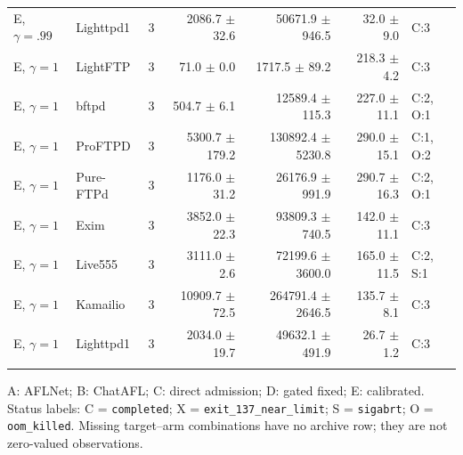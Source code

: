 \begin{longtable}{@{}llrrrrl@{}}
E, $\gamma=.99$ & Lighttpd1 & 3 & 2086.7 $\pm$ 32.6 & 50671.9 $\pm$ 946.5 & 32.0 $\pm$ 9.0 & C:3 \\
\addlinespace[3pt]
E, $\gamma=1$ & LightFTP & 3 & 71.0 $\pm$ 0.0 & 1717.5 $\pm$ 89.2 & 218.3 $\pm$ 4.2 & C:3 \\
E, $\gamma=1$ & bftpd & 3 & 504.7 $\pm$ 6.1 & 12589.4 $\pm$ 115.3 & 227.0 $\pm$ 11.1 & C:2, O:1 \\
E, $\gamma=1$ & ProFTPD & 3 & 5300.7 $\pm$ 179.2 & 130892.4 $\pm$ 5230.8 & 290.0 $\pm$ 15.1 & C:1, O:2 \\
E, $\gamma=1$ & Pure-FTPd & 3 & 1176.0 $\pm$ 31.2 & 26176.9 $\pm$ 991.9 & 290.7 $\pm$ 16.3 & C:2, O:1 \\
E, $\gamma=1$ & Exim & 3 & 3852.0 $\pm$ 22.3 & 93809.3 $\pm$ 740.5 & 142.0 $\pm$ 11.1 & C:3 \\
E, $\gamma=1$ & Live555 & 3 & 3111.0 $\pm$ 2.6 & 72199.6 $\pm$ 3600.0 & 165.0 $\pm$ 11.5 & C:2, S:1 \\
E, $\gamma=1$ & Kamailio & 3 & 10909.7 $\pm$ 72.5 & 264791.4 $\pm$ 2646.5 & 135.7 $\pm$ 8.1 & C:3 \\
E, $\gamma=1$ & Lighttpd1 & 3 & 2034.0 $\pm$ 19.7 & 49632.1 $\pm$ 491.9 & 26.7 $\pm$ 1.2 & C:3 \\
\addlinespace[3pt]
\end{longtable}
\noindent\footnotesize A: AFLNet; B: ChatAFL; C: direct admission; D: gated fixed; E: calibrated. Status labels: C = \texttt{completed}; X = \texttt{exit\_137\_near\_limit}; S = \texttt{sigabrt}; O = \texttt{oom\_killed}. Missing target--arm combinations have no archive row; they are not zero-valued observations.
\endgroup
